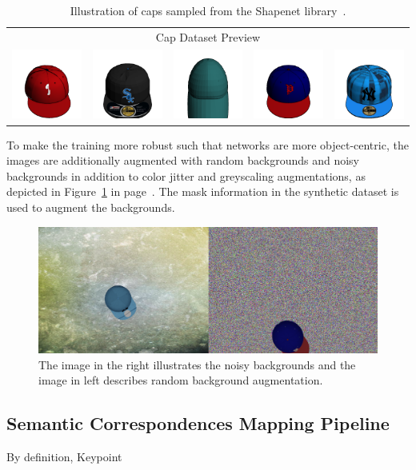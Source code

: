 \begin{table}[htb]
    \centering
    \begin{tabular}{ccccc}
        \hline
        \multicolumn{5}{c}{Cap Dataset Preview}                                                                                                                                                                                                                                                                                                                \\
        \multicolumn{1}{c}{\includegraphics[scale=0.12]{images/cap/1.png}} & \multicolumn{1}{c}{\includegraphics[scale=0.12]{images/cap/2.png}} & \multicolumn{1}{c}{\includegraphics[scale=0.12]{images/cap/3.png}} & \multicolumn{1}{c}{\includegraphics[scale=0.12]{images/cap/4.png}} & \multicolumn{1}{c}{\includegraphics[scale=0.12]{images/cap/5.png}} \\ \hline
    \end{tabular}
    \caption{Illustration of caps sampled from the Shapenet library~\cite{chang2015shapenet}.}
    \label{table:cap_dataset}
\end{table}

To make the training more robust such that networks are more object-centric, the images are additionally augmented with random backgrounds and noisy backgrounds in
addition to color jitter and greyscaling augmentations, as depicted in Figure~\ref{fog:back_augmentations} in page~\pageref{fog:back_augmentations}. The mask information in the synthetic dataset is used to augment the backgrounds.

\begin{figure}[htb]
    \centering
    \caption{The image in the right illustrates the noisy backgrounds and the image in left describes random background augmentation.}
    \label{fog:back_augmentations}
    \includegraphics[scale=0.2]{images/cap/back_augs.png}
\end{figure}


\subsection{Semantic Correspondences Mapping Pipeline}

By definition, Keypoint